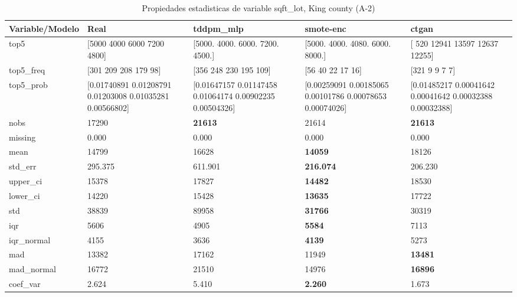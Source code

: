 \begin{table}[H]
\centering
\fontsize{8}{14}\selectfont
\caption{Propiedades  estadisticas de variable sqft\_lot, King county (A-2)}
\label{table-stats-king county-a-2-sqft_lot}
\begin{tabular}{|l|m{10em}|m{10em}|m{10em}|m{10em}|}
\hline
 \rowcolor[gray]{0.8}
Variable/Modelo & Real & tddpm\_mlp & smote-enc & ctgan \\
\hline top5 & [5000 4000 6000 7200 4800] & [5000. 4000. 6000. 7200. 4500.] & [5000. 4000. 4080. 6000. 8000.] & [  520 12941 13597 12637 12255] \\
\hline top5\_freq & [301 209 208 179  98] & [356 248 230 195 109] & [56 40 22 17 16] & [321   9   9   7   7] \\
\hline top5\_prob & [0.01740891 0.01208791 0.01203008 0.01035281 0.00566802] & [0.01647157 0.01147458 0.01064174 0.00902235 0.00504326] & [0.00259091 0.00185065 0.00101786 0.00078653 0.00074026] & [0.01485217 0.00041642 0.00041642 0.00032388 0.00032388] \\
\hline nobs & 17290 & \bfseries 21613 & \cellcolor[rgb]{0.9, 0.54, 0.52} 21614 & \bfseries 21613 \\
\hline missing & 0.000 & 0.000 & 0.000 & 0.000 \\
\hline mean & 14799 & 16628 & \bfseries 14059 & \cellcolor[rgb]{0.9, 0.54, 0.52} 18126 \\
\hline std\_err & 295.375 & \cellcolor[rgb]{0.9, 0.54, 0.52} 611.901 & \bfseries 216.074 & 206.230 \\
\hline upper\_ci & 15378 & 17827 & \bfseries 14482 & \cellcolor[rgb]{0.9, 0.54, 0.52} 18530 \\
\hline lower\_ci & 14220 & 15428 & \bfseries 13635 & \cellcolor[rgb]{0.9, 0.54, 0.52} 17722 \\
\hline std & 38839 & \cellcolor[rgb]{0.9, 0.54, 0.52} 89958 & \bfseries 31766 & 30319 \\
\hline iqr & 5606 & 4905 & \bfseries 5584 & \cellcolor[rgb]{0.9, 0.54, 0.52} 7113 \\
\hline iqr\_normal & 4155 & 3636 & \bfseries 4139 & \cellcolor[rgb]{0.9, 0.54, 0.52} 5273 \\
\hline mad & 13382 & \cellcolor[rgb]{0.9, 0.54, 0.52} 17162 & 11949 & \bfseries 13481 \\
\hline mad\_normal & 16772 & \cellcolor[rgb]{0.9, 0.54, 0.52} 21510 & 14976 & \bfseries 16896 \\
\hline coef\_var & 2.624 & \cellcolor[rgb]{0.9, 0.54, 0.52} 5.410 & \bfseries 2.260 & 1.673 \\

\end{tabular}
\end{table}
